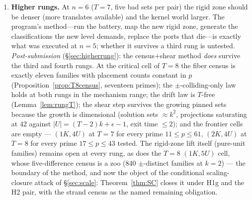 \begin{enumerate}[leftmargin=1.7em,itemsep=4pt]
\item \textbf{Higher rungs.} At $n=6$ ($T=7$, five bad sets per pair) the
  rigid zone should be denser (more translates available) and the kernel
  world larger. The program's method---run the battery, map the new
  rigid zone, generate the classifications the new level demands, replace
  the ports that die---is exactly what was executed at $n=5$; whether it
  survives a third rung is untested. \emph{Post-submission}
  (\S\ref{sec:higherrung}): the census+shear method \emph{does} survive
  the third and fourth rungs. At the critical cell of $T=8$ the fiber
  census is exactly eleven families with placement counts constant in
  $p$ (Proposition~\ref{prop:T8census}, seventeen primes); the
  $\pm$-colliding-only law holds at both rungs in the mechanism range;
  the drift law is $T$-free (Lemma~\ref{lem:rungT}); the shear step
  survives the growing pinned sets because the growth is dimensional
  (solution sets $\approx k^2$, projections saturating at $42$ against
  $|U|=(T-2)k+\epsilon-1$, exit time $\le2$); and the frontier cells are
  empty --- $(1K,4U)$ at $T=7$ for every prime $11\le p\le61$, $(2K,4U)$
  at $T=8$ for every prime $17\le p\le43$ tested. The rigid-zone lift
  itself (pure-unit families) remains open at every rung, as does the
  $T=8$ $(1K,5U)$ cell, whose five-difference census is a zoo (840
  $\pm$-distinct families at $k=2$) --- the boundary of the method,
  and now the object of the conditional scaling-closure attack of
  \S\ref{sec:scale}: Theorem~\ref{thm:SC} closes it under H1g and the
  H2 pair, with the strand census as the named remaining obligation.


\end{enumerate}
